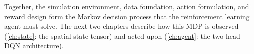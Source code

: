 \medskip

Together, the simulation environment, data foundation, action formulation, and reward design form the Markov decision process that the reinforcement learning agent must solve. The next two chapters describe how this MDP is observed (\cref{ch:state}: the spatial state tensor) and acted upon (\cref{ch:agent}: the two-head DQN architecture).
